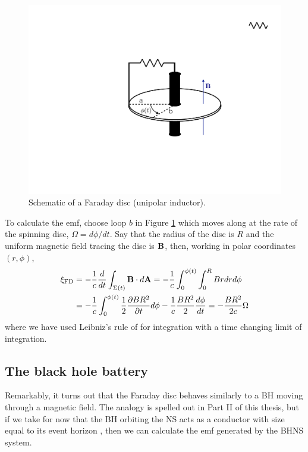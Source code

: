 \begin{figure}
\begin{center}
\includegraphics[scale=0.33]{figures/ch0/UI_schematic} 
\end{center}
\caption{Schematic of a Faraday disc (unipolar inductor).}
\label{Fig:FDschem}
\end{figure}


To calculate the emf, choose loop $b$ in Figure \ref{Fig:FDschem} which moves
along at the rate of the spinning disc, $\Omega = d\phi/dt$. Say that the
radius of the disc is $R$ and the uniform magnetic field tracing the disc is ${\bf B}$, then, working in polar coordinates $(r, \phi)$,
\begin{align}
\xi_{\rm FD} &= - \frac{1}{c} \frac{d}{dt} \int_{\Sigma(t)}{{\bf B} \cdot d{\bf A}} =  - \frac{1}{c} \int^{\phi(t)}_{0} \int^{R}_{0}{B r dr d\phi}  \\
&= - \frac{1}{c} \int^{\phi(t)}_{0}{\frac{1}{2}\frac{\partial B R^2}{\partial t} d\phi} -  \frac{1}{c} \frac{B R^2}{2} \frac{d\phi}{dt}  = -\frac{B R^2}{2c} \Omega
\end{align}
where we have used Leibniz's rule of for integration with a time changing limit of integration. 

\subsection{The black hole battery} 
Remarkably, it turns out that the Faraday
disc behaves similarly to a BH moving through a magnetic field. The analogy is
spelled out in Part II of this thesis, but if we take for now that the BH
orbiting the NS acts as a conductor with size equal to its event horizon
\citep{MPBook}, then we can calculate the emf generated by the BHNS system.

